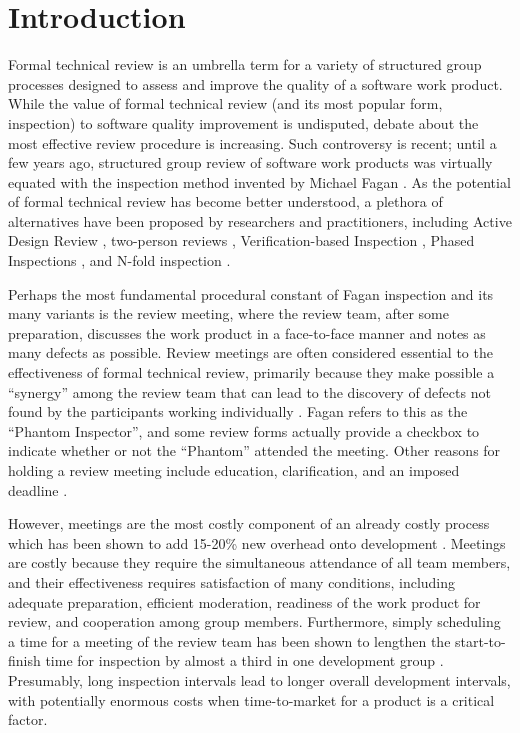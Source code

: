 \newpage


\section{Introduction}

Formal technical review is an umbrella term for a variety of structured
group processes designed to assess and improve the quality of a software
work product.  While the value of formal technical review (and its most
popular form, inspection) to software quality improvement is undisputed,
debate about the most effective review procedure is increasing.  Such
controversy is recent; until a few years ago, structured group review of
software work products was virtually equated with the inspection method
invented by Michael Fagan \cite{Fagan76,Fagan86}.  As the potential of
formal technical review has become better understood, a plethora of
alternatives have been proposed by researchers and practitioners,
including Active Design Review \cite{Parnas85, Parnas87}, 
two-person reviews \cite{Bisant89}, Verification-based Inspection
\cite{Dyer92}, Phased Inspections \cite{Knight93}, and N-fold inspection
\cite{Martin90}.

Perhaps the most fundamental procedural constant of Fagan inspection and
its many variants is the review meeting, where the review team, after some
preparation, discusses the work product in a face-to-face manner and notes
as many defects as possible.  Review meetings are often considered
essential to the effectiveness of formal technical review, primarily
because they make possible a ``synergy'' among the review team that can
lead to the discovery of defects not found by the participants working
individually \cite{Ackerman89,Weller93}.  Fagan refers to this as the ``Phantom Inspector'', and some
review forms actually provide a checkbox to indicate whether or not the
``Phantom'' attended the meeting.  Other reasons for holding a review
meeting include education, clarification, and an imposed deadline
\cite{Gilb93,Strauss93}.

However, meetings are the most costly component of an already costly
process which has been shown to add 15-20\% new overhead onto development
\cite{Russell91}. Meetings are costly because they require the simultaneous
attendance of all team members, and their effectiveness requires
satisfaction of many conditions, including adequate preparation, efficient
moderation, readiness of the work product for review, and cooperation among
group members.  Furthermore, simply scheduling a time for a meeting of the
review team has been shown to lengthen the start-to-finish time for
inspection by almost a third in one development group \cite{Votta93}.
Presumably, long inspection intervals lead to longer overall development
intervals, with potentially enormous costs when time-to-market for a
product is a critical factor.


